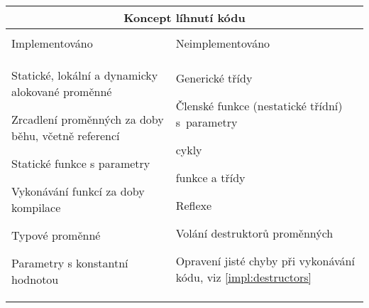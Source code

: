 \begin{center}
	\begin{tabular}{p{} p{}}
		\multicolumn{2}{c}{\bfseries \large Koncept líhnutí kódu} \\
		\hline \\
		Implementováno & Neimplementováno \\
		\begin{compactitem}
				\item Statické, lokální a dynamicky alokované \ctime proměnné
				\item Zrcadlení \ctime proměnných za doby běhu, včetně referencí
				\item Statické funkce s \ctime parametry
				\item Vykonávání funkcí za doby kompilace
				\item Typové proměnné
				\item Parametry s konstantní hodnotou
		\end{compactitem} &
		\begin{compactitem}
				\item Generické třídy
				\item Členské funkce (nestatické třídní) s~\ctime parametry
				\item \ctime cykly
				\item \ctime funkce a třídy
				\item Reflexe
				\item Volání destruktorů \ctime proměnných
				\item Opravení jisté chyby při vykonávání \ctime kódu, viz \autoref{impl:destructors}
		\end{compactitem} \\
	\end{tabular}
\end{center}
